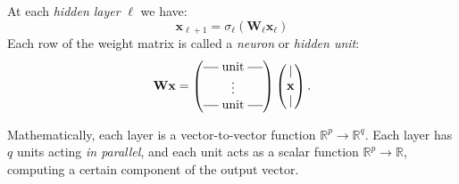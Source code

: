 

At each \emph{hidden layer} $\ell$ we have:
\begin{equation}
    \mathbf{x}_{\ell+1} = \sigma_\ell(  \mathbf{W}_\ell \mathbf{x}_{\ell} )
\end{equation}
Each row of the weight matrix is called a \emph{neuron} or \emph{hidden unit}:
\begin{equation}
\mathbf{Wx} = \begin{pmatrix} \rule[.5ex]{1.2em}{0.4pt} \hspace{0.1cm} \textrm{unit} \hspace{0.1cm}  \rule[.5ex]{1.2em}{0.4pt} \\ \vdots \\  \rule[.5ex]{1.2em}{0.4pt} \hspace{0.1cm} \textrm{unit} \hspace{0.1cm}  \rule[.5ex]{1.2em}{0.4pt}  \end{pmatrix} \begin{pmatrix}|\\\mathbf{x}\\|\end{pmatrix}.
\end{equation}

Mathematically, each layer is a vector-to-vector function $\mathbb{R}^p \to \mathbb{R}^q$. Each layer has $q$ units acting \emph{in parallel}, and each unit acts as a scalar function $\mathbb{R}^p\to\mathbb{R}$, computing a certain component of the output vector.
